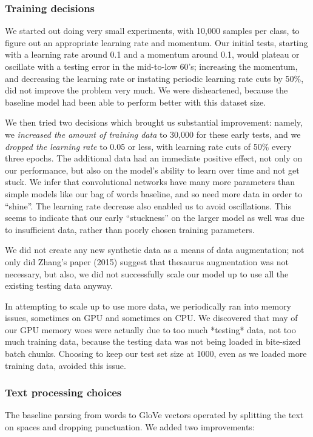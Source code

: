 \documentclass{article}
\begin{document}
\subsubsection*{Training decisions}

We started out doing very small experiments, with 10,000 samples per class, to figure out an appropriate learning rate and momentum. Our initial tests, starting with a learning rate around 0.1 and a momentum around 0.1, would plateau or oscillate with a testing error in the mid-to-low 60's; increasing the momentum, and decreasing the learning rate or instating periodic learning rate cuts by 50\%, did not improve the problem very much. We were disheartened, because the baseline model had been able to perform better with this dataset size.

We then tried two decisions which brought us substantial improvement: namely, we \emph{increased the amount of training data} to 30,000 for these early tests, and we \emph{dropped the learning rate} to 0.05 or less, with learning rate cuts of 50\% every three epochs. The additional data had an immediate positive effect, not only on our performance, but also on the model's ability to learn over time and not get stuck. We infer that convolutional networks have many more parameters than simple models like our bag of words baseline, and so need more data in order to ``shine''. The learning rate decrease also enabled us to avoid oscillations. This seems to indicate that our early ``stuckness'' on the larger model as well was due to insufficient data, rather than poorly chosen training parameters.

We did not create any new synthetic data as a means of data augmentation; not only did Zhang's paper (2015) suggest that thesaurus augmentation was not necessary, but also, we did not successfully scale our model up to use all the existing testing data anyway.

In attempting to scale up to use more data, we periodically ran into memory issues, sometimes on GPU and sometimes on CPU. We discovered that may of our GPU memory woes were actually due to too much *testing* data, not too much training data, because the testing data was not being loaded in bite-sized batch chunks. Choosing to keep our test set size at 1000, even as we loaded more training data, avoided this issue.

\subsubsection*{Text processing choices}
The baseline parsing from words to GloVe vectors operated by splitting the text on spaces and dropping punctuation. We added two improvements:
\end{document}
